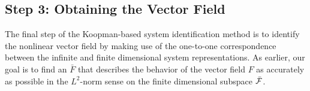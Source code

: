 \subsection{Step 3: Obtaining the Vector Field} \label{sec:step3}

The final step of the Koopman-based system identification method is to identify the nonlinear vector field by making use of the one-to-one correspondence between the infinite and finite dimensional system representations.
As earlier, our goal is to find an $\bar{F}$ that describes the behavior of the vector field $F$ as accurately as possible in the $L^2$-norm sense on the finite dimensional subspace $\bar{\mathcal{F}}$.






